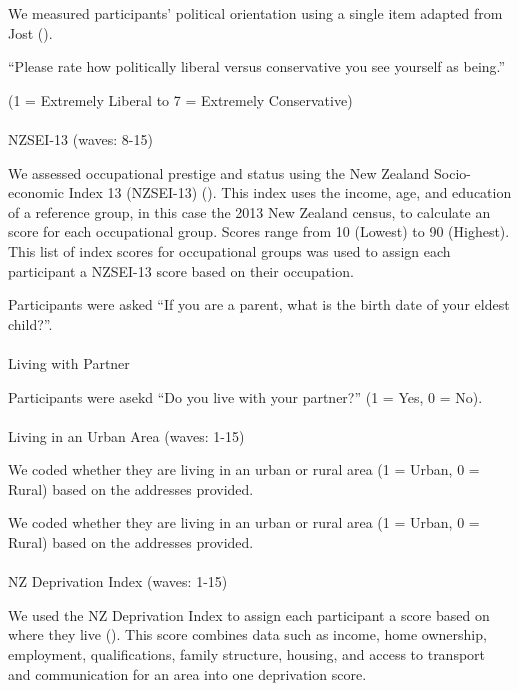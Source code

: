 \documentclass[
  singlecolumn,
  9pt]{scrartcl}
\makeatletter
\let\oldparagraph\paragraph
\renewcommand{\paragraph}{
    \@ifstar
      \xxxParagraphStar
      \xxxParagraphNoStar
  }
\newcommand{\xxxParagraphStar}[1]{\oldparagraph*{#1}\mbox{}}
\newcommand{\xxxParagraphNoStar}[1]{\oldparagraph{#1}\mbox{}}
\makeatother
\begin{document}
We measured participants' political orientation using a single item
adapted from Jost ().

``Please rate how politically liberal versus conservative you see
yourself as being.''

(1 = Extremely Liberal to 7 = Extremely Conservative)

\paragraph{NZSEI-13 (waves: 8-15)}\label{nzsei-13-waves-8-15}

We assessed occupational prestige and status using the New Zealand
Socio-economic Index 13 (NZSEI-13) (). This index uses the income, age, and education of
a reference group, in this case the 2013 New Zealand census, to
calculate an score for each occupational group. Scores range from 10
(Lowest) to 90 (Highest). This list of index scores for occupational
groups was used to assign each participant a NZSEI-13 score based on
their occupation.

Participants were asked ``If you are a parent, what is the birth date of
your eldest child?''.

\paragraph{Living with Partner}\label{living-with-partner}

Participants were asekd ``Do you live with your partner?'' (1 = Yes, 0 =
No).

\paragraph{Living in an Urban Area (waves:
1-15)}\label{living-in-an-urban-area-waves-1-15}

We coded whether they are living in an urban or rural area (1 = Urban, 0
= Rural) based on the addresses provided.

We coded whether they are living in an urban or rural area (1 = Urban, 0
= Rural) based on the addresses provided.

\paragraph{NZ Deprivation Index (waves:
1-15)}\label{nz-deprivation-index-waves-1-15}

We used the NZ Deprivation Index to assign each participant a score
based on where they live (). This score combines data such as income, home ownership,
employment, qualifications, family structure, housing, and access to
transport and communication for an area into one deprivation score.
\end{document}

